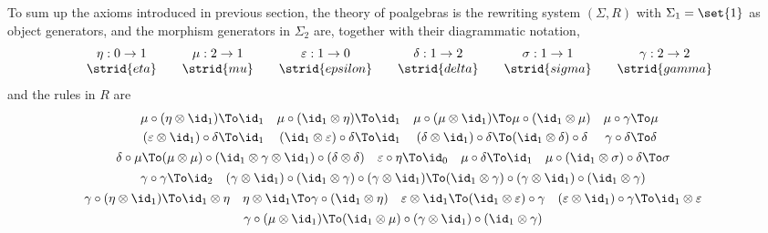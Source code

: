 \documentclass[submission,copyright,creativecommons]{eptcs}
\theoremstyle{definition}
\theoremstyle{remark}
\begin{document}
To sum up the axioms introduced in previous section, the theory of poalgebras is
the rewriting system $(\Sigma,R)$ with $\Sigma_1=\set{1}$ as object generators,
and the morphism generators in $\Sigma_2$ are, together with their diagrammatic
notation,
\[
\begin{array}{c@{\qquad}c@{\qquad}c@{\qquad}c@{\qquad}c@{\qquad}c}
  \eta:0\to 1
  &
  \mu:2\to 1
  &
  \varepsilon:1\to 0
  &
  \delta:1\to 2
  &
  \sigma:1\to 1
  &
  \gamma:2\to 2
  \\
  \strid{eta}
  &
  \strid{mu}
  &
  \strid{epsilon}
  &
  \strid{delta}
  &
  \strid{sigma}
  &
  \strid{gamma}
\end{array}
\]
and the rules in $R$ are
\begin{gather*}
  \begin{align*}
    \mu\circ(\eta\otimes\id_1)&\To\id_1
    &
    \mu\circ(\id_1\otimes\eta)&\To\id_1
    &
    \mu\circ(\mu\otimes\id_1)&\To\mu\circ(\id_1\otimes\mu)
    &
    \mu\circ\gamma&\To\mu
    \\
    (\varepsilon\otimes\id_1)\circ\delta&\To\id_1
    &
    (\id_1\otimes\varepsilon)\circ\delta&\To\id_1
    &
    (\delta\otimes\id_1)\circ\delta&\To(\id_1\otimes\delta)\circ\delta
    &
    \gamma\circ\delta&\To\delta
  \end{align*}
  \\
  \begin{align*}
  \delta\circ\mu&\To(\mu\otimes\mu)\circ(\id_1\otimes\gamma\otimes\id_1)\circ(\delta\otimes\delta)
  &
  \varepsilon\circ\eta&\To\id_0
  &
  \mu\circ\delta&\To\id_1
  &
  \mu\circ(\id_1\otimes\sigma)\circ\delta&\To\sigma
  \end{align*}
  \\
  \begin{align*}
    \gamma\circ\gamma&\To\id_2
    &
    (\gamma\otimes\id_1)\circ(\id_1\otimes\gamma)\circ(\gamma\otimes\id_1)&\To(\id_1\otimes\gamma)\circ(\gamma\otimes\id_1)\circ(\id_1\otimes\gamma)
  \end{align*}
  \\
  \begin{align*}
    \gamma\circ(\eta\otimes\id_1)&\To\id_1\otimes\eta
    &
    \eta\otimes\id_1&\To\gamma\circ(\id_1\otimes\eta)
    &
    \varepsilon\otimes\id_1&\To(\id_1\otimes\varepsilon)\circ\gamma
    &
    (\varepsilon\otimes\id_1)\circ\gamma&\To\id_1\otimes\varepsilon
  \end{align*}
  \\
  \begin{align*}
    \gamma\circ(\mu\otimes\id_1)&\To (\id_1\otimes\mu)\circ(\gamma\otimes\id_1)\circ(\id_1\otimes\gamma)

\end{align*}
\end{gather*}
\end{document}
